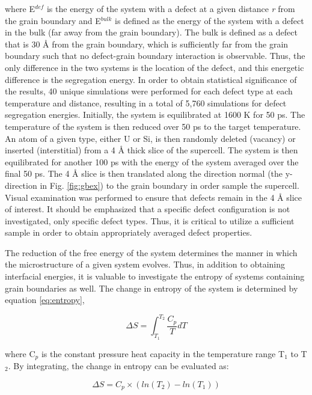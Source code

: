 \documentclass[review]{elsarticle}
\begin{document}
where E$^{def}$ is the energy of the system with a defect at a given distance \textit{r} from the grain boundary and E$^{bulk}$ is defined as the energy of the system with a defect in the bulk (far away from the grain boundary). The bulk is defined as a defect that is 30 {\AA} from the grain boundary, which is sufficiently far from the grain boundary such that no defect-grain boundary interaction is observable. Thus, the only difference in the two systems is the location of the defect, and this energetic difference is the segregation energy. In order to obtain statistical significance of the results, 40 unique simulations were performed for each defect type at each temperature and distance, resulting in a total of 5,760 simulations for defect segregation energies. Initially, the system is equilibrated at 1600 K for 50 ps. The temperature of the system is then reduced over 50 ps to the target temperature. An atom of a given type, either U or Si, is then randomly deleted (vacancy) or inserted (interstitial) from a 4 {\AA} thick slice of the supercell. The system is then equilibrated for another 100 ps with the energy of the system averaged over the final 50 ps. The 4 {\AA} slice is then translated along the direction normal (the y-direction in Fig. \ref{fig:gbex}) to the grain boundary in order sample the supercell. Visual examination was performed to ensure that defects remain in the 4 {\AA} slice of interest. It should be emphasized that a specific defect configuration is not investigated, only specific defect types. Thus, it is critical to utilize a sufficient sample in order to obtain appropriately averaged defect properties.

The reduction of the free energy of the system determines the manner in which the microstructure of a given system evolves. Thus, in addition to obtaining interfacial energies, it is valuable to investigate the entropy of systems containing grain boundaries as well. The change in entropy of the system is determined by equation \ref{eq:entropy},

\begin{equation}
\label{eq:entropy}
\Delta S = \int_{T_{1}}^{T_{2}} \frac{C_{p}}{T} dT
\end{equation}

where C$_{p}$ is the constant pressure heat capacity in the temperature range T$_{1}$ to T$_{2}$. By integrating, the change in entropy can be evaluated as:

\begin{equation}
\label{eq:entropy2}
\Delta S = C_{p} \times (ln(T_{2}) - ln(T_{1})) 
\end{equation}
\end{document}
